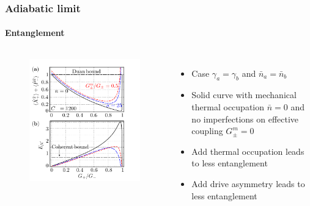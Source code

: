 \documentclass[aspectratio=43]{beamer}
\begin{document}
\begin{frame}
	
	\frametitle{Adiabatic limit}
	\framesubtitle{Entanglement}
	
	\begin{columns}
		
		
		\begin{figure}
			\includegraphics[width = 6 cm]{plots/plot_entanglement.png}
		\end{figure}	
	
		
		\begin{itemize}
			\item Case $\gamma_{a} = \gamma_{b}$ and $\bar{n}_{a} = \bar{n}_{b}$
			\item Solid curve with mechanical thermal occupation $\bar{n} = 0$ and no imperfections on effective coupling $G^{m}_{\pm} = 0$
			\item Add thermal occupation leads to less entanglement
			\item Add drive asymmetry leads to less entanglement
		\end{itemize}
		
	\end{columns}

\end{frame}
\end{document}
